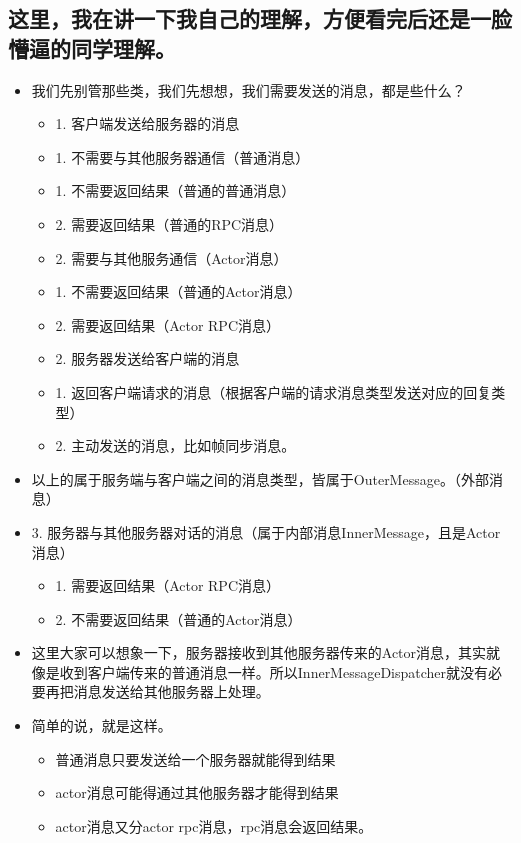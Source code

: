 \documentclass[9pt, b5paper]{article}
\begin{document}
\subsection{这里，我在讲一下我自己的理解，方便看完后还是一脸懵逼的同学理解。}
\label{sec-22-3}
\begin{itemize}
\item 我们先别管那些类，我们先想想，我们需要发送的消息，都是些什么？
\begin{itemize}
\item 1. 客户端发送给服务器的消息
\item 1. 不需要与其他服务器通信（普通消息）
\item 1. 不需要返回结果（普通的普通消息）
\item 2. 需要返回结果（普通的RPC消息）
\item 2. 需要与其他服务通信（Actor消息）
\item 1. 不需要返回结果（普通的Actor消息）
\item 2. 需要返回结果（Actor RPC消息）
\item 2. 服务器发送给客户端的消息
\item 1. 返回客户端请求的消息（根据客户端的请求消息类型发送对应的回复类型）
\item 2. 主动发送的消息，比如帧同步消息。
\end{itemize}
\item 以上的属于服务端与客户端之间的消息类型，皆属于OuterMessage。（外部消息）
\item 3. 服务器与其他服务器对话的消息（属于内部消息InnerMessage，且是Actor消息）
\begin{itemize}
\item 1. 需要返回结果（Actor RPC消息）
\item 2. 不需要返回结果（普通的Actor消息）
\end{itemize}
\item 这里大家可以想象一下，服务器接收到其他服务器传来的Actor消息，其实就像是收到客户端传来的普通消息一样。所以InnerMessageDispatcher就没有必要再把消息发送给其他服务器上处理。
\item 简单的说，就是这样。
\begin{itemize}
\item 普通消息只要发送给一个服务器就能得到结果
\item actor消息可能得通过其他服务器才能得到结果
\item actor消息又分actor rpc消息，rpc消息会返回结果。
\end{itemize}
\end{itemize}
\end{document}
